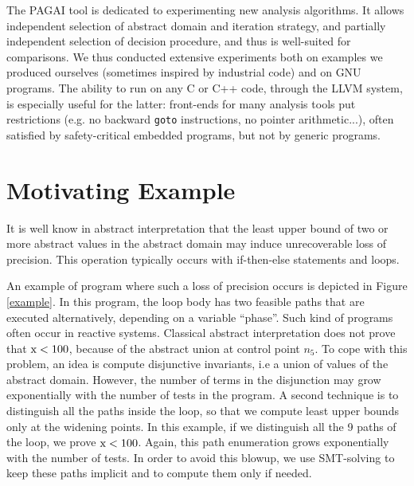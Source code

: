 \documentclass{entcs}
\begin{document}
The PAGAI tool is dedicated to experimenting new analysis algorithms.
It allows independent selection of abstract domain and iteration strategy, and partially independent selection of decision procedure, and thus is well-suited for comparisons.
We thus conducted extensive experiments both on examples we produced ourselves (sometimes inspired by industrial code) and on GNU programs.
The ability to run on any C or C++ code, through the LLVM system, is especially useful for the latter: front-ends for many analysis tools put restrictions (e.g. no backward \lstinline|goto| instructions, no pointer arithmetic...), often satisfied by safety-critical embedded programs, but not by generic programs.

\section{Motivating Example}

It is well know in abstract interpretation that the least upper bound of two or
more abstract values in the abstract domain 
may induce unrecoverable loss of precision. This operation typically occurs with
if-then-else statements and loops.

An example of program where such a loss of precision occurs is depicted in
Figure \ref{example}. In this program, the loop body has two feasible paths that
are executed alternatively, depending on a variable ``phase''. Such kind of
programs often occur in reactive systems. 
Classical abstract interpretation does not prove that $\lstinline|x| < 100$,
because of the abstract union at control point $n_5$. 
To cope with this problem, an idea is compute disjunctive invariants, i.e a
union of values of the abstract domain. However, the number of terms in the
disjunction may grow exponentially with the number of tests in the program.
A second technique is to distinguish all the paths inside the loop, so that we
compute least upper bounds only at the widening points. In this example, if we
distinguish all the 9 paths of the loop, we prove $\lstinline|x| < 100$. Again,
this path enumeration grows exponentially with the number of tests. In order to
avoid this blowup, we use SMT-solving to keep these paths implicit and to
compute them only if needed.
\end{document}
